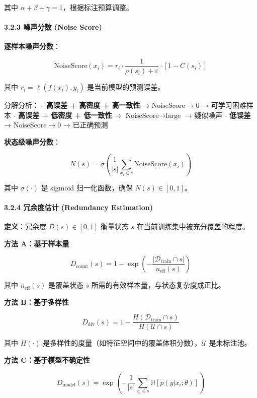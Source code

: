 \documentclass[
  12pt,
]{ctexart}
\begin{document}
其中 \(\alpha + \beta + \gamma = 1\)，根据标注预算调整。

\paragraph{3.2.3 噪声分数 (Noise
Score)}\label{ux566aux58f0ux5206ux6570-noise-score}

\textbf{逐样本噪声分数}：

\[
\text{NoiseScore}(x_i) = r_i \cdot \frac{1}{\rho(s_i) + \varepsilon} \cdot [1 - C(s_i)]
\]

其中 \(r_i = \ell(f(x_i), y_i)\) 是当前模型的预测误差。

分解分析： - \textbf{高误差 + 高密度 + 高一致性} →
\(\text{NoiseScore} \to 0\) → 可学习困难样本 - \textbf{高误差 + 低密度 +
低一致性} → \(\text{NoiseScore} \to \text{large}\) → 疑似噪声 -
\textbf{低误差} → \(\text{NoiseScore} \to 0\) → 已正确预测

\textbf{状态级噪声分数}：

\[
N(s) = \sigma\left(\frac{1}{|s|} \sum_{x_i \in s} \text{NoiseScore}(x_i)\right)
\]

其中 \(\sigma(\cdot)\) 是 sigmoid 归一化函数，确保 \(N(s) \in [0,1]\)。

\paragraph{3.2.4 冗余度估计 (Redundancy
Estimation)}\label{ux5197ux4f59ux5ea6ux4f30ux8ba1-redundancy-estimation}

\textbf{定义}：冗余度 \(D(s) \in [0,1]\) 衡量状态 \(s\)
在当前训练集中被充分覆盖的程度。

\textbf{方法 A：基于样本量}

\[
D_{\text{count}}(s) = 1 - \exp\left(-\frac{|\mathcal{D}_{\text{train}} \cap s|}{n_{\text{eff}}(s)}\right)
\]

其中 \(n_{\text{eff}}(s)\) 是覆盖状态 \(s\)
所需的有效样本量，与状态复杂度成正比。

\textbf{方法 B：基于多样性}

\[
D_{\text{div}}(s) = 1 - \frac{H(\mathcal{D}_{\text{train}} \cap s)}{H(\mathcal{U} \cap s)}
\]

其中 \(H(\cdot)\)
是多样性的度量（如特征空间中的覆盖体积分数），\(\mathcal{U}\)
是未标注池。

\textbf{方法 C：基于模型不确定性}

\[
D_{\text{model}}(s) = \exp\left(- \frac{1}{|s|} \sum_{x_i \in s} \mathbb{H}[p(y|x_i; \theta)] \right)
\]
\end{document}
